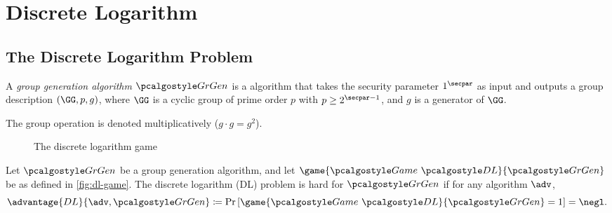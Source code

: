 \section{Discrete Logarithm}\label{sec:discrete-log}

\subsection{The Discrete Logarithm Problem}

\begin{definition}
  A \emph{group generation algorithm} $\grgen$ is a \ppt algorithm that takes the security parameter $1^\secpar$ as input and outputs a group description $(\GG, p, g)$, where $\GG$ is a cyclic group of prime order $p$ with $p \geq 2^{\secpar-1}$, and $g$ is a generator of $\GG$.
\end{definition}

\begin{remark}
  The group operation is denoted multiplicatively ($g\cdot g = g^2$).
\end{remark}


\begin{figure}[tbhp]
  \begin{center}
    \begin{tcolorbox}[width=5cm]
      \begin{pchstack}[center]
      \end{pchstack}
    \end{tcolorbox}
  \end{center}
  \caption{The discrete logarithm game\label{fig:dl-game}}
\end{figure}

\begin{definition}
  Let $\grgen$ be a group generation algorithm, and let $\game{\Game~\algo{DL}}{\grgen}$ be as defined in \autoref{fig:dl-game}.
  The discrete logarithm (DL) problem is hard for $\grgen$ if for any \ppt algorithm $\adv$,
  \[
  \advantage{DL}{\adv, \grgen} \defeq \pr{\game{\Game~\algo{DL}}{\grgen} = 1} = \negl.
  \]
\end{definition}

